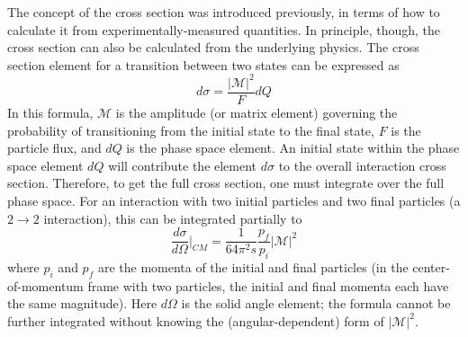 
The concept of the cross section was introduced previously, 
in terms of how to calculate it from experimentally-measured 
quantities.  
In principle, though, the cross section 
can also be calculated from the underlying physics.  
The cross section element for a transition 
between two states can be expressed as 
\[
d \sigma = \frac{ \left| \mathcal{M} \right| ^2 }{F} d Q
\]
In this formula, $\mathcal{M}$ is the amplitude 
(or matrix element) governing the probability of 
transitioning from the initial state to the final state, 
$F$ is the particle flux, and $d Q$ is the 
phase space element.  
An initial state within the phase space element $d Q$ will 
contribute the element $d \sigma$ to the overall 
interaction cross section.  
Therefore, to get the full cross section, one must integrate 
over the full phase space.  
For an interaction with two initial particles and 
two final particles 
(a $2 \rightarrow 2$ interaction), 
this can be integrated partially to 
\[
\frac{d \sigma}{d \Omega} \bigg| _{CM} 
= \frac{1}{64 \pi^2 s} \frac{p_f}{p_i} \left| \mathcal{M} \right| ^2
\]
where $p_i$ and $p_f$ are the momenta of the initial and final particles 
(in the center-of-momentum frame with two particles, 
the initial and final momenta each have the same magnitude).  
Here $d \Omega$ is the solid angle element; 
the formula cannot be further integrated without knowing the 
(angular-dependent) form of $ \left| \mathcal{M} \right| ^2 $.  


